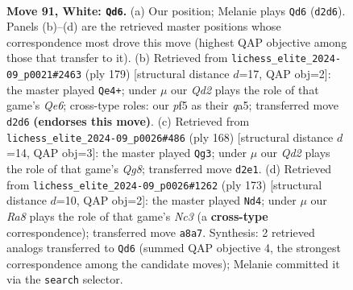 \documentclass[11pt]{article}
\begin{document}
\clearpage

\begin{figure}[p]\centering
\begin{subfigure}{0.46\textwidth}\centering
\resizebox{\linewidth}{!}{%
\newchessgame
\chessboard[
  setfen={R7/8/6p1/5p2/2k2P2/8/3Q2K1/8 w - - 1 91},
  showmover=false,
  pgfstyle=straightmove, color=movearrow, markmove={d2-d6}
]}
\caption{}
\end{subfigure}\hfill
\begin{subfigure}{0.46\textwidth}\centering
\resizebox{\linewidth}{!}{%
\newchessgame
\chessboard[
  setfen={8/4k3/6K1/Q7/8/1p2q3/8/8 b - - 57 90},
  showmover=false,
  pgfstyle=straightmove, color=movearrow, markmove={e3-e4}
]}
\caption{}
\end{subfigure}
\\[4pt]
\begin{subfigure}{0.46\textwidth}\centering
\resizebox{\linewidth}{!}{%
\newchessgame
\chessboard[
  setfen={6Q1/8/5p2/3K1P2/1k6/8/8/8 w - - 5 85},
  showmover=false,
  pgfstyle=straightmove, color=movearrow, markmove={g8-g3}
]}
\caption{}
\end{subfigure}\hfill
\begin{subfigure}{0.46\textwidth}\centering
\resizebox{\linewidth}{!}{%
\newchessgame
\chessboard[
  setfen={8/5k2/P1n5/4p3/4P3/1q6/8/4K3 b - - 1 87},
  showmover=false,
  pgfstyle=straightmove, color=movearrow, markmove={c6-d4}
]}
\caption{}
\end{subfigure}
\caption{\textbf{Move 91, White: \texttt{Qd6}.} (a) Our position; Melanie plays \texttt{Qd6} (\texttt{d2d6}). Panels (b)--(d) are the retrieved master positions whose correspondence most drove this move (highest QAP objective among those that transfer to it). (b) Retrieved from \texttt{lichess\_elite\_2024-09\_p0021\#2463} (ply 179) [structural distance $d$=17, QAP obj=2]: the master played \texttt{Qe4+}; under $\mu$ our \emph{Qd2} plays the role of that game's \emph{Qe6}; cross-type roles: our \emph{p}f5 as their \emph{q}a5; transferred move \texttt{d2d6} \textbf{(endorses this move)}. (c) Retrieved from \texttt{lichess\_elite\_2024-09\_p0026\#486} (ply 168) [structural distance $d$=14, QAP obj=3]: the master played \texttt{Qg3}; under $\mu$ our \emph{Qd2} plays the role of that game's \emph{Qg8}; transferred move \texttt{d2e1}. (d) Retrieved from \texttt{lichess\_elite\_2024-09\_p0026\#1262} (ply 173) [structural distance $d$=10, QAP obj=2]: the master played \texttt{Nd4}; under $\mu$ our \emph{Ra8} plays the role of that game's \emph{Nc3} (a \textbf{cross-type} correspondence); transferred move \texttt{a8a7}. Synthesis: 2 retrieved analogs transferred to \texttt{Qd6} (summed QAP objective 4, the strongest correspondence among the candidate moves); Melanie committed it via the \texttt{search} selector.}
\label{fig:thought-m180}
\end{figure}
\end{document}
